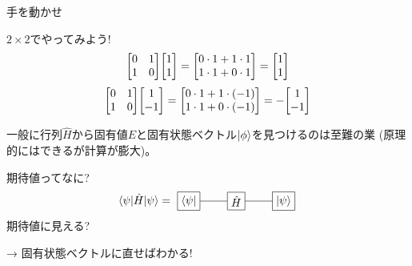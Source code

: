 \documentclass[dvipdfm]{beamer}
\begin{document}
\begin{frame}{手を動かせ}
    \begin{eg*}{$2\times2$でやってみよう!}{}
        \begin{equation*}
            \mqty[0 & 1 \\ 1 & 0]
            \mqty[1 \\ 1]
            =
            \mqty[0\cdot1+1\cdot1 \\ 1\cdot1+0\cdot1]
            =
            \mqty[1 \\ 1]
        \end{equation*}
        \begin{equation*}
            \mqty[0 & 1 \\ 1 & 0]
            \mqty[1 \\ -1]
            =
            \mqty[0\cdot1+1\cdot(-1) \\ 1\cdot1+0\cdot(-1)]
            =
            -\mqty[1 \\ -1]
        \end{equation*}
    \end{eg*}
    一般に行列$\hat{H}$から固有値$E$と固有状態ベクトル$\ket{\phi}$を見つけるのは至難の業
    (原理的にはできるが計算が膨大)。
\end{frame}

\begin{frame}{期待値ってなに?}
    \begin{equation*}
        \ev{\hat{H}}{\psi}
        =
        \vcenter{\hbox{
            \begin{tikzpicture}
                \node at(0,0)[draw, rectangle](H){$\hat{H}$};
                \node at(1.5,0)[draw, rectangle](ket){$\ket{\psi}$};
                \node at(-1.5,0)[draw, rectangle](bra){$\bra{\psi}$};
                \draw(H.west)--(bra.east);
                \draw(H.east)--(ket.west);
            \end{tikzpicture}
        }}
    \end{equation*}
    期待値に見える?

    → 固有状態ベクトルに直せばわかる!
\end{frame}
\end{document}
